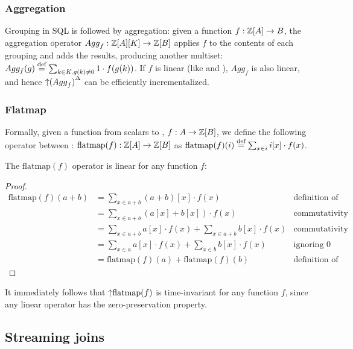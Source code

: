 \subsubsection{Aggregation}

Grouping in SQL is followed by aggregation: given a function $f: \mathbb{Z}[A] \to B$, 
the aggregation operator ${Agg}_f: \mathbb{Z}[A][K] \to \mathbb{Z}[B]$ applies $f$ to the contents of 
each grouping and adds the results, producing another multiset: 
${Agg_f}(g) \stackrel{\textrm{\scriptsize def}}{=} \sum_{k \in K. g(k) \neq 0} 1 \cdot f(g(k))$.  
If $f$ is linear (like  and ), 
${Agg}_f$ is also linear, and hence ${{\uparrow}({Agg}_f)}^{\Delta}$ can be 
efficiently incrementalized.

\subsubsection{Flatmap}

Formally, given a function from scalars to \zrs, $f : A \rightarrow \mathbb{Z}[B]$, 
we define the following operator between \zrs:
$\mbox{flatmap}(f): \mathbb{Z}[A] \rightarrow \mathbb{Z}[B]$ as 
$\mbox{flatmap}(f)(i) \stackrel{\textrm{\scriptsize def}}{=} \sum_{x \in i} i[x] \cdot f(x)$.

\begin{proposition}
The $\mbox{flatmap}(f)$ operator is linear for any function $f$: 
\end{proposition}

\begin{proof}
$$
\begin{aligned}
\mbox{flatmap}(f)(a + b) &= \sum_{x \in a+b} (a+b)[x] \cdot f(x) & \mbox{definition of flatmap} \\
 &= \sum_{x \in a+b} (a[x] + b[x]) \cdot f(x) &\mbox{commutativity of plus} \\
 &= \sum_{x \in a+b} a[x] \cdot f(x) + \sum_{x \in a+b} b[x] \cdot f(x) & \mbox{commutativity} \\
 &= \sum_{x \in a} a[x] \cdot f(x) + \sum_{x \in b} b[x] \cdot f(x) & \mbox{ignoring 0 terms} \\
 &= \mbox{flatmap}(f)(a) + \mbox{flatmap}(f)(b) & \mbox{definition of flatmap}
\end{aligned}
$$
\end{proof}

It immediately follows that ${\uparrow}\mbox{flatmap}(f)$ is time-invariant for any function $f$,
since any linear operator has the zero-preservation property.

\subsection{Streaming joins}

